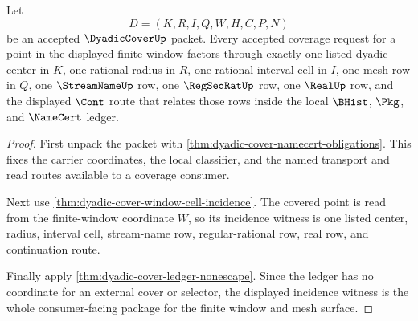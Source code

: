 \begin{theorem}
\label{thm:dyadic-cover-finite-window-mesh-incidence-package}
Let
$$
D=(K,R,I,Q,W,H,C,P,N)
$$
be an accepted $\DyadicCoverUp$ packet. Every accepted coverage request for a
point in the displayed finite window factors through exactly one listed
dyadic center in $K$, one rational radius in $R$, one rational interval cell in
$I$, one mesh row in $Q$, one $\StreamNameUp$ row, one $\RegSeqRatUp$ row, one
$\RealUp$ row, and the displayed $\Cont$ route that relates those rows inside
the local $\BHist$, $\Pkg$, and $\NameCert$ ledger.
\end{theorem}
\begin{proof}
First unpack the packet with
\autoref{thm:dyadic-cover-namecert-obligations}. This fixes the carrier
coordinates, the local classifier, and the named transport and read routes
available to a coverage consumer.

Next use \autoref{thm:dyadic-cover-window-cell-incidence}. The covered point
is read from the finite-window coordinate $W$, so its incidence witness is one
listed center, radius, interval cell, stream-name row, regular-rational row,
real row, and continuation route.

Finally apply \autoref{thm:dyadic-cover-ledger-nonescape}. Since the ledger
has no coordinate for an external cover or selector, the displayed incidence
witness is the whole consumer-facing package for the finite window and mesh
surface.
\end{proof}

